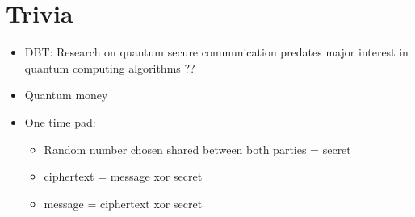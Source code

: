 \documentclass[12pt]{article}
\begin{document}
\section{Trivia}
\begin{itemize}
\item
  DBT:
  Research on quantum secure communication predates major interest in
  quantum computing algorithms ??
\item Quantum money
\item One time pad:
  \begin{itemize}
  \item Random number chosen shared between both parties = secret
  \item ciphertext = message xor secret
  \item message = ciphertext xor secret
  \end{itemize}
\end{itemize}
\end{document}
